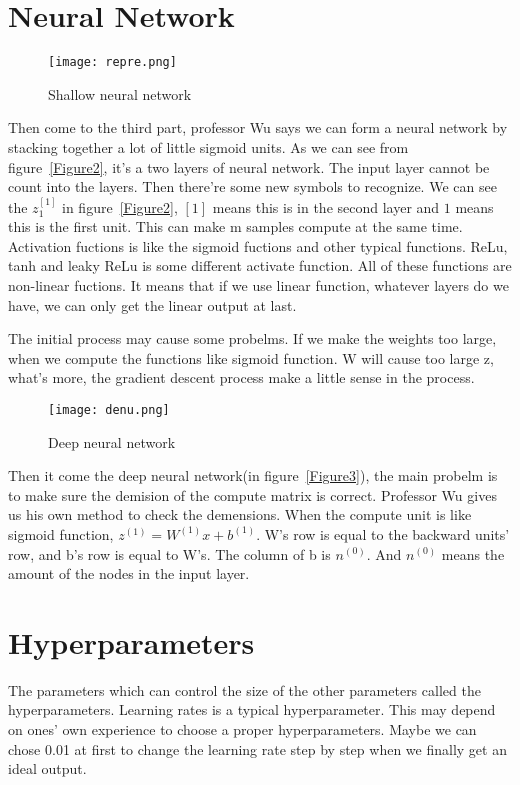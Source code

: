\documentclass[letterpaper]{article}
\begin{document}
\section{Neural Network}
\begin{figure}[!htb]
	\centering
	\texttt{[image: repre.png]}\\
	\caption{Shallow neural network}
\end{figure}\label{Figure2}
Then come to the third part, professor Wu says we can form a neural network by stacking together a lot of little sigmoid units. As we can see from figure~\ref{Figure2}, it's a two layers of neural network. The input layer cannot be count into the layers. Then there're some new symbols to recognize. We can see the $z_{1}^{[1]}$ in figure~\ref{Figure2}, $[1]$ means this is in the second layer and $1$ means this is the first unit. This can make m samples compute at the same time. Activation fuctions is like the sigmoid fuctions and other typical functions. ReLu, tanh and leaky ReLu is some different activate function. All of these functions are non-linear fuctions. It means that if we use linear function, whatever layers do we have, we can only get the linear output at last.
\par The initial process may cause some probelms. If we make the weights too large, when we compute the functions like sigmoid function. W will cause too large z, what's more, the gradient descent process make a little sense in the process.
\begin{figure}[!htb]
	\centering
	\texttt{[image: denu.png]}\\
	\caption{Deep neural network}
\end{figure}\label{Figure3}
\par Then it come the deep neural network(in figure~\ref{Figure3}), the main probelm is to make sure the demision of the compute matrix is correct. Professor Wu gives us his own method to check the demensions. When the compute unit is like sigmoid function, $z^(1)=W^(1)x+b^(1)$. W's row is equal to the backward units' row, and b's row is equal to W's. The column of b is $n^(0)$. And $n^(0)$ means the amount of the nodes in the input layer. 
\section{Hyperparameters}
The parameters which can control the size of the other parameters called the hyperparameters. Learning rates is a typical hyperparameter. This may depend on ones' own experience to choose a proper hyperparameters. Maybe we can chose 0.01 at first to change the learning rate step by step when we finally get an ideal output.
\end{document}
